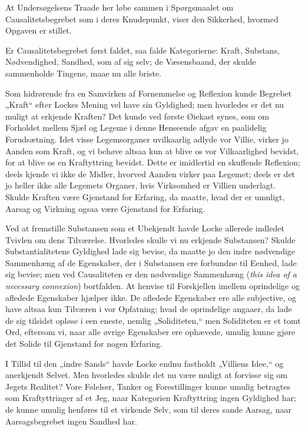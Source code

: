 \documentclass[12pt]{book}
\newcommand{\opage}[1]{\marginnote{\footnotesize\textit{[#1]}}}
\begin{document}
At Undersøgelsens Traade her løbe sammen i Spørgsmaalet om Causalitetsbegrebet som i
deres Knudepunkt, viser den Sikkerhed, hvormed Opgaven er stillet.

Er Causalitetsbegrebet først faldet, saa falde Kategorierne: Kraft, Substans,
Nødvendighed, Sandhed, som af sig selv; de Væsensbaand, der skulde sammenholde
Tingene, maae nu alle briste.

Som hidrørende fra en Samvirken af Fornemmelse og Reflexion kunde Begrebet „Kraft“
efter Lockes Mening vel have sin Gyldighed; men hvorledes er det nu muligt at
erkjende Kraften? Det kunde ved første Øiekast synes, som om Forholdet mellem Sjæl
og Legeme i denne Henseende afgav en paalidelig Forudsætning. Idet visse
Legemsorganer uvilkaarlig adlyde vor Villie, virker jo Aanden som Kraft, og vi
behøve altsaa kun at blive os vor Vilkaarlighed bevidst, for at blive os en
Kraftyttring bevidst. Dette er imidlertid en skuffende Reflexion; deels kjende vi
ikke de Midler, hvorved Aanden virker paa Legemet; deels er det jo heller ikke alle
Legemets Organer, hvis Virksomhed er Villien underlagt. Skulde Kraften være
Gjenstand for Erfaring, da maatte, hvad der er umuligt, Aarsag og Virkning ogsaa
være Gjenstand for Erfaring.

Ved at fremstille Substansen som et Ubekjendt havde Locke allerede indledet Tvivlen
om dens Tilværelse. Hvorledes skulle vi nu erkjende Substansen? Skulde
Substantialitetens Gyldighed lade sig bevise, da maatte jo den indre nødvendige
Sammenhæng af de Egenskaber, der i Substansen ere forbundne til Eenhed, lade sig
bevise; men ved Causaliteten er den nødvendige Sammenhæng (\textit{this idea of a
necessary connexion}) bortfalden. At henvise til Forskjellen imellem oprindelige og
afledede Egenskaber hjælper ikke. De afledede Egenskaber ere alle subjective, og
have altsaa kun
\opage{17} Tilværen i vor Opfatning; hvad de oprindelige angaaer, da lade de sig tilsidst
opløse i een eneste, nemlig „Soliditeten,“ men Soliditeten er et tomt Ord, eftersom
vi, naar alle øvrige Egenskaber ere ophævede, umulig kunne gjøre det Solide til
Gjenstand for nogen Erfaring.

I Tillid til den „indre Sands“ havde Locke endnu fastholdt „Villiens Idee,“ og
anerkjendt Selvet. Men hvorledes skulde det nu være muligt at forvisse sig om Jegets
Realitet? Vore Følelser, Tanker og Forestillinger kunne umulig betragtes som
Kraftyttringer af et Jeg, naar Kategorien Kraftyttring ingen Gyldighed har; de
kunne umulig henføres til et virkende Selv, som til deres sande Aarsag, naar
Aarsagsbegrebet ingen Sandhed har.
\end{document}
